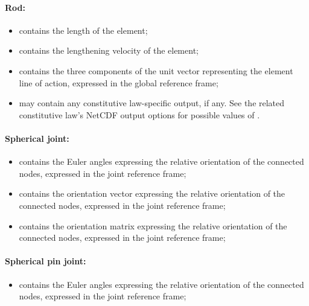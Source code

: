 \paragraph{Rod:}
\begin{itemize}
\item {} contains the length of the
  element;
\item {} contains the lengthening
  velocity of the element;
\item {} contains the three components of
  the unit vector representing the element line of action, expressed 
  in the global reference frame;
\item {} may contain any constitutive law-specific output, if any.
  See the related constitutive law's NetCDF output options for possible values of .
\end{itemize}

\paragraph{Spherical joint:}
\begin{itemize}
\item {} contains the Euler angles 
  expressing the relative orientation of the connected nodes, expressed in 
  the joint reference frame;
\item {} contains the orientation vector
  expressing the relative orientation of the connected nodes, expressed in 
  the joint reference frame;
\item {} contains the orientation matrix
  expressing the relative orientation of the connected nodes, expressed in 
  the joint reference frame;
\end{itemize}

\paragraph{Spherical pin joint:}
\begin{itemize}
\item {} contains the Euler angles 
  expressing the relative orientation of the connected nodes, expressed in 
  the joint reference frame;
\end{itemize}

